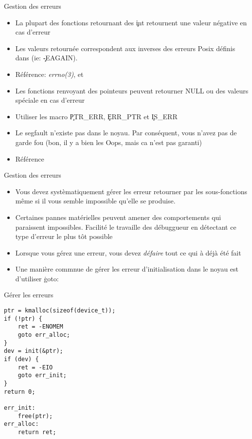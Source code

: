 \begin{frame}[fragile=singleslide]{Gestion des erreurs}
  \begin{itemize} 
  \item La plupart des fonctions retournant des \c{int} retournent une
    valeur négative en cas d'erreur
  \item Les  valeurs retournée correspondent aux  inverses des erreurs
    Posix  définis dans   (ie:  \c{-EAGAIN}). 
  \item   Référence:   \emph{errno(3)},      et
  \item  Les  fonctions  renvoyant des  pointeurs  peuvent
    retourner NULL ou des valeurs spéciale en cas d'erreur
  \item Utiliser les macro \c{PTR_ERR}, \c{ERR_PTR} et \c{IS_ERR}
  \item Le segfault n'existe pas  dans le noyau.  Par conséquent, vous
    n'avez pas de garde fou (bon, il  y a bien les Oops, mais ca n'est
    pas garanti)
  \item Référence 
  \end{itemize}
\end{frame}

\begin{frame}[fragile=singleslide]{Gestion des erreurs}
  \begin{itemize} 
  \item Vous devez systèmatiquement gérer les erreur retourner par les
    sous-fonctions  même  si  il  vous semble  impossible  qu'elle  se
    produise.
  \item Certaines pannes  matérielles peuvent amener des comportements
    qui paraissent  impossibles. Facilité le  travaille des débuggueur
    en détectant ce type d'erreur le plus tôt possible
  \item Lorsque vous gérez  une erreur, vous devez \emph{défaire} tout
    ce qui à déjà été fait
  \item Une manière commnue  de gérer les erreur d'initialisation dans
    le noyau est d'utiliser \c{goto}:
  \end{itemize}
\end{frame}

\begin{frame}[fragile=singleslide]{Gérer les erreurs}
    \begin{lstlisting}
ptr = kmalloc(sizeof(device_t));
if (!ptr) {
    ret = -ENOMEM
    goto err_alloc;
}
dev = init(&ptr);
if (dev) {
    ret = -EIO
    goto err_init;
}
return 0;

err_init:
    free(ptr);
err_alloc:
    return ret;
    \end{lstlisting} 
\end{frame} 


